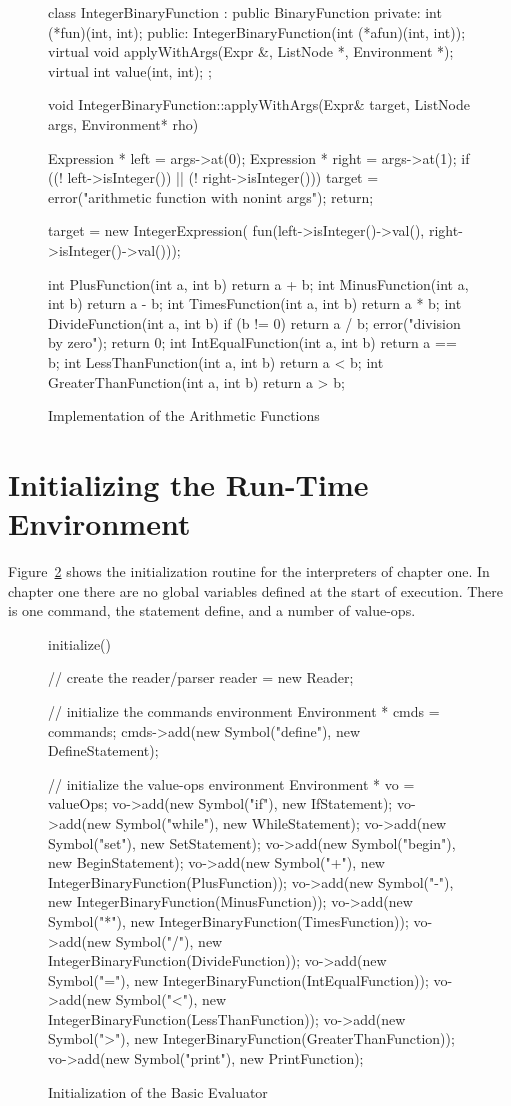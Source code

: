 \begin{figure}
\begin{cprog}
class IntegerBinaryFunction : public BinaryFunction {
private:
	int (*fun)(int, int);
public:
	IntegerBinaryFunction(int (*afun)(int, int));
	virtual void applyWithArgs(Expr &, ListNode *, Environment *);
	virtual int value(int, int);
};

void IntegerBinaryFunction::applyWithArgs(Expr& target, ListNode  args, 
		Environment* rho)
{
	Expression * left = args->at(0);
	Expression * right = args->at(1);
	if ((! left->isInteger()) || (! right->isInteger())) {
		target = error("arithmetic function with nonint args");
		return;
		}
	
	target =  new IntegerExpression(
		fun(left->isInteger()->val(), right->isInteger()->val()));
}

int PlusFunction(int a, int b) { return a + b; }
int MinusFunction(int a, int b) { return a - b; }
int TimesFunction(int a, int b) { return a * b; }
int DivideFunction(int a, int b)
{
	if (b != 0)
		return a / b;
	error("division by zero");
	return 0;
}
int IntEqualFunction(int a, int b) { return a == b; }
int LessThanFunction(int a, int b) { return a < b; }
int GreaterThanFunction(int a, int b) { return a > b; }
\end{cprog}
\caption{Implementation of the Arithmetic Functions}\label{plusfun}
\end{figure}

\section{Initializing the Run-Time Environment}

Figure~\ref{chap1init} shows the initialization routine for the
interpreters of chapter one.  In chapter one there are no global variables
defined at the start of execution.  There is one command, the statement
{\sf define}, and a number of value-ops.

\begin{figure}
\begin{cprog}
initialize()
{
	// create the reader/parser
	reader = new Reader;

	// initialize the commands environment
	Environment * cmds = commands;
	cmds->add(new Symbol("define"), new DefineStatement);

	// initialize the value-ops environment
	Environment * vo = valueOps;
	vo->add(new Symbol("if"), new IfStatement);
	vo->add(new Symbol("while"), new WhileStatement);
	vo->add(new Symbol("set"), new SetStatement);
	vo->add(new Symbol("begin"), new BeginStatement);
	vo->add(new Symbol("+"), new IntegerBinaryFunction(PlusFunction));
	vo->add(new Symbol("-"), new IntegerBinaryFunction(MinusFunction));
	vo->add(new Symbol("*"), new IntegerBinaryFunction(TimesFunction));
	vo->add(new Symbol("/"), new IntegerBinaryFunction(DivideFunction));
	vo->add(new Symbol("="), new IntegerBinaryFunction(IntEqualFunction));
	vo->add(new Symbol("<"), new IntegerBinaryFunction(LessThanFunction));
	vo->add(new Symbol(">"), new IntegerBinaryFunction(GreaterThanFunction));
	vo->add(new Symbol("print"), new PrintFunction);
}
\end{cprog}
\caption{Initialization of the Basic Evaluator}\label{chap1init}
\end{figure}
